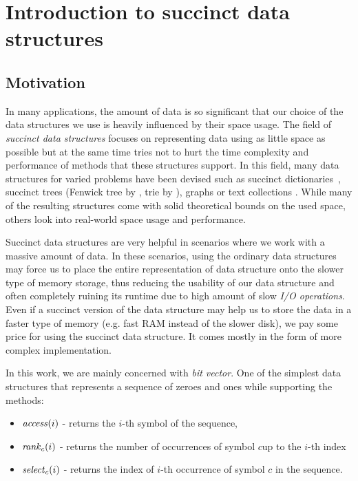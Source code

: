 \chapter{Introduction to succinct data structures}
\label{kap:kap1}


\section{Motivation}

In many applications, the amount of data is so significant that our choice of
the data structures we use is heavily influenced by their space usage. The field
of \textit{succinct data structures} focuses on representing data using as little
space as possible but at the same time tries not to hurt the time complexity and
performance of methods that these structures support. In this field, many data structures
for varied problems have been devised such as succinct dictionaries~\citep{raman2007succinct},
succinct trees (Fenwick tree by \cite{bille2017succinct}, trie by \cite{grossi2015fast}),
graphs \citep{farzan2013succinct} or text collections \citep{ferragina2000opportunistic}.
While many of the resulting structures come with solid theoretical bounds on the used space,
others look into real-world space usage and performance.

Succinct data structures are very helpful in scenarios where we work with a massive amount of
data. In these scenarios, using the ordinary data structures may force us to place
the entire representation of data structure onto the slower type of memory storage, thus
reducing the usability of our data structure and often completely ruining its runtime due to
high amount of slow \textit{I/O operations}. Even if a succinct version of the data structure
may help us to store the data in a faster type of memory (e.g. fast RAM instead of the slower disk),
we pay some price for using the succinct data structure. It comes mostly in the form of more
complex implementation.

In this work, we are mainly concerned with \textit{bit vector}. One of the simplest
data structures that represents a sequence of zeroes and ones while supporting the
methods:
\begin{itemize}
\item $\mathit{access}(i)$ - returns the $i$-th symbol of the sequence,
\item $\mathit{rank}_c(i)$ - returns the number of occurrences of symbol $c$up to the $i$-th index
\item $\mathit{select}_c(i)$ - returns the index of $i$-th occurrence of symbol $c$ in the sequence.
\end{itemize}

